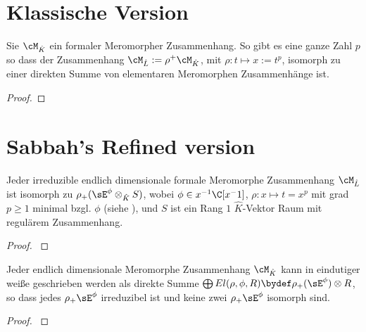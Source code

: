 \section{Klassische Version}
\begin{thm}
\cite[Thm 5.4.7]{sabbah_cimpa90}
Sie $\cM_{\hat K}$ ein formaler Meromorpher Zusammenhang. So gibt es eine
ganze Zahl $p$ so dass der Zusammenhang $\cM_{\hat L}:=\rho^+\cM_{\hat K}$,
mit $\rho:t\mapsto x:=t^p$, isomorph zu einer direkten Summe von elementaren
Meromorphen Zusammenhänge
ist.
\end{thm}
\begin{proof}

\end{proof}

\section{Sabbah's Refined version}
\begin{prop}
\cite[Prop 3.1]{sabbah_Fourier-local}
Jeder irreduzible endlich dimensionale formale Meromorphe Zusammenhang
$\cM_{\hat L}$ ist isomorph zu $\rho_+(\sE^\phi\otimes_{\hat K} S)$, wobei
$\phi\in x^{-1}\C[x^-1]$, $\rho:x\mapsto t=x^p$ mit grad $p\geq1$ minimal bzgl.
$\phi$ (siehe \cite[Rem 2.8]{sabbah_Fourier-local}), und $S$ ist ein Rang $1$
$\hat K$-Vektor Raum mit regulärem Zusammenhang.
\end{prop}
\begin{proof}
\cite[Prop 3.1]{sabbah_Fourier-local}
\end{proof}

\begin{thm}
\cite[Cor 3.3]{sabbah_Fourier-local}
Jeder endlich dimensionale Meromorphe Zusammenhang $\cM_{\hat K}$ kann in
eindutiger weiße geschrieben werden als direkte Summe $\bigoplus
El(\rho,\phi,R)\bydef\rho_+(\sE^\phi)\otimes R$, so dass
jedes $\rho_+\sE^\phi$ irreduzibel ist und keine zwei $\rho_+\sE^\phi$ isomorph
sind.
\end{thm}
\begin{comment}
In welchem Raum ist $\cM$ ?? in $L$ oder in $K$
\end{comment}
\begin{proof}
\cite[Cor 3.3]{sabbah_Fourier-local}
\end{proof}

